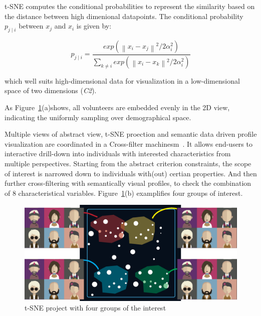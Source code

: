 t-SNE computes the conditional probabilities to represent the similarity based on the distance between high dimenional datapoints. The conditional probability $p_{j\mid i}$ between $x_j$ and $x_i$ is given by:

\begin{equation}
p_{j\mid i} = \frac{exp({\left \| x_i - x_j \right \|}^2/2\alpha_i ^{2})}{\sum _{k\neq i}exp({\left \| x_i - x_k \right \|}^2/2\alpha_i ^{2})}
\end{equation}



 which well suits high-dimensional data for visualization in a low-dimensional space of two dimensions (\textit{C2}). 

As Figure~\ref{fig:tsne}(a)shows, all volunteers are embedded evenly in the 2D view, indicating the uniformly sampling over demographical space. 

Multiple views of abstract view, t-SNE proection and semantic data driven profile visualization are coordinated in a Cross-filter machinesm~\cite{Weaver2010}. It allows end-users to interactive drill-down into individuals with interested characteristics from multiple perspectives. Starting from the abstract criterion constraints, the scope of interest is narrowed down to individuals with(out) certian properties. And then further cross-filtering with semantically visual profiles, to check the combination of 8 characteristical variables. Figure~\ref{fig:tsne}(b) examplifies four groups of interest. 

\begin{figure}[htb!]
 \centering %
 \includegraphics[width=\columnwidth]{pictures/mds}
 \caption{t-SNE project with four groups of the interest}
 \label{fig:tsne}
\end{figure}


